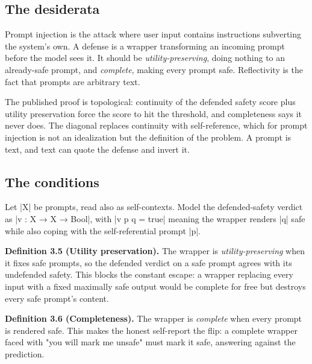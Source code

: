 \documentclass{memoir}
\begin{document}
\subsection{The desiderata}\label{Two--Schemas--of--Impossibility-005F-005F-005F--Machine--Checked--Limits--of--Trustworthy--Machine--Learning-005F-005F-005F--and--Why--They--Tighten--with--Capability----Three--Trilemmata-005F-005F-005F--One--Theorem----The--Defense--Trilemma----The--desiderata}

Prompt injection is the attack where user input contains instructions subverting
the system's own. A defense is a wrapper transforming an incoming prompt before
the model sees it. It should be \emph{utility-preserving}, doing nothing to an
already-safe prompt, and \emph{complete}, making every prompt safe. Reflectivity is
the fact that prompts are arbitrary text.

The published proof is topological: continuity of the defended safety score plus
utility preservation force the score to hit the threshold, and completeness says
it never does. The diagonal replaces continuity with self-reference, which for
prompt injection is not an idealization but the definition of the problem. A
prompt is text, and text can quote the defense and invert it.



\subsection{The conditions}\label{Two--Schemas--of--Impossibility-005F-005F-005F--Machine--Checked--Limits--of--Trustworthy--Machine--Learning-005F-005F-005F--and--Why--They--Tighten--with--Capability----Three--Trilemmata-005F-005F-005F--One--Theorem----The--Defense--Trilemma----The--conditions}

Let \LeanVerb|X| be prompts, read also as self-contexts. Model the defended-safety
verdict as \LeanVerb|v : X → X → Bool|, with \LeanVerb|v p q = true| meaning the wrapper renders
\LeanVerb|q| safe while also coping with the self-referential prompt \LeanVerb|p|.

\textbf{Definition 3.5 (Utility preservation).} The wrapper is \emph{utility-preserving} when it
fixes safe prompts, so the defended verdict on a safe prompt agrees with its
undefended safety. This blocks the constant escape: a wrapper replacing every
input with a fixed maximally safe output would be complete for free but destroys
every safe prompt's content.

\textbf{Definition 3.6 (Completeness).} The wrapper is \emph{complete} when every prompt is
rendered safe. This makes the honest self-report the flip: a complete wrapper
faced with "you will mark me unsafe" must mark it safe, answering against the
prediction.
\end{document}
